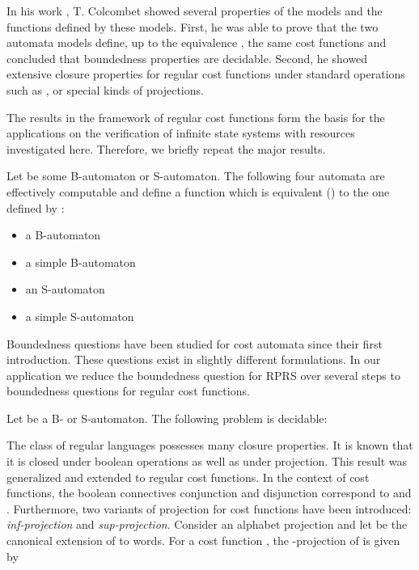\documentclass{LMCS}
\newcommand{\RPRS}{\textsf{RPRS}}
\begin{document}
In his work \cite{regularcostfunctions}, T. Colcombet showed several properties
of the models and the functions defined by these models. First, he was able to
prove that the two automata models define, up to the equivalence 
, the same cost functions and concluded that boundedness 
properties are decidable. Second, he showed extensive closure properties for 
regular cost functions under standard operations such as ,  or 
special kinds of projections. 

The results in the framework of regular cost functions form the basis for the
applications on the verification of infinite state systems with resources
investigated here. Therefore, we briefly repeat the major results.

\begin{thm}\label{thm:EqualExpressivenessOfSandB}
	Let  be some B-automaton or S-automaton. The following four
    automata are effectively computable and define a function which is
    equivalent () to the one defined by :
	\begin{itemize}
		\item a B-automaton 
		\item a simple B-automaton 
		\item an S-automaton 
		\item a simple S-automaton 
	\end{itemize}
\end{thm}

Boundedness questions have been studied for cost automata since their first
introduction. These questions exist in slightly different formulations. In
our application we reduce the boundedness question for \RPRS{} over several
steps to boundedness questions for regular cost functions.

\begin{thm}\label{thm:BoundednessOfCounterautomataIsDecidable}
 Let  be a B- or S-automaton. The following problem is decidable:
 
\end{thm}

The class of regular languages possesses many closure properties. It is
known that it is closed under boolean operations as well as under projection.
This result was generalized and extended to regular cost functions.
In the context of cost functions, the boolean connectives conjunction and
disjunction correspond to  and . Furthermore, two variants of
projection for cost functions have been introduced: 
\emph{inf-projection} and \emph{sup-projection}. Consider an alphabet projection
 and let  be the
canonical extension of  to words. For a cost function 
, the -projection 
 of  is given by  
\end{document}

